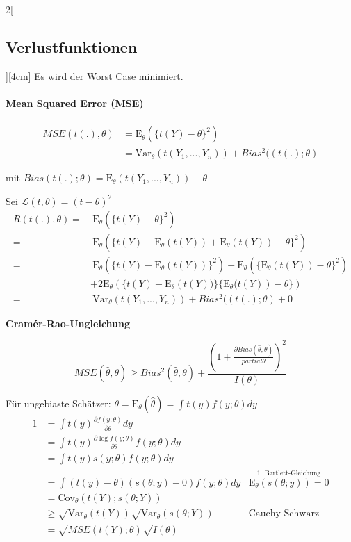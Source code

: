 \documentclass[8pt]{extarticle}
\begin{document}
\begin{multicols}{2}[\subsection{Verlustfunktionen}][4cm]
\noindent Es wird der Worst Case minimiert.

\paragraph{Mean Squared Error (MSE)}
\begin{align*}
MSE(t(.), \theta) &= \mathrm{E}_\theta\left(\{t(Y)-\theta\}^2\right) \\
&=\mathrm{Var}_\theta\left(t(Y_1,...,Y_n)\right) + Bias^2((t(.); \theta)
\end{align*}

\noindent mit $Bias(t(.);\theta) = \mathrm{E}_\theta\left(t(Y_1,...,Y_n)\right)-\theta$

\begin{Beweis}
Sei $\mathcal{L}(t, \theta) = (t-\theta)^2$
\begin{align*}
R(t(.), \theta) = &\: \mathrm{E}_\theta (\{t(Y) -\theta\}^2) \\
= &\: \mathrm{E}_\theta (\{t(Y) - \mathrm{E}_\theta(t(Y)) + \mathrm{E}_\theta(t(Y))-\theta\}^2) \\
= &\: \mathrm{E}_\theta (\{t(Y) - \mathrm{E}_\theta(t(Y))\}^2) +
\mathrm{E}_\theta (\{\mathrm{E}_\theta(t(Y))-\theta\}^2) \\
& +  2\mathrm{E}_\theta (\{t(Y)-\mathrm{E}_\theta \left(t(Y))\}\{\mathrm{E}_\theta (t(Y)\right)-\theta\}) \\
= &\: \mathrm{Var}_\theta(t(Y_1,...,Y_n)) + Bias^2((t(.); \theta) + 0
\end{align*}
\end{Beweis}

\textbf{Cramér-Rao-Ungleichung}

$$MSE(\hat{\theta}, \theta) \geq Bias^2(\hat{\theta},\theta) + 
\frac{\left(1+
\frac{\partial Bias(\hat{\theta}, \theta)}{partial \theta}
\right)^2}{I(\theta)}$$

\begin{Beweis}
Für ungebiaste Schätzer: $ \theta = \mathrm{E}_\theta(\hat{\theta}) = \int t(y)f(y;\theta)dy$
\begin{align*}
1 &= \int t(y) \frac{\partial f(y;\theta)}{\partial \theta} dy \\
&= \int t(y) \frac{\partial \log f(y;\theta)}{\partial \theta} f(y;\theta) dy \\
&= \int t(y) s(y;\theta) f(y;\theta) dy \\
&= \int \left( t(y)-\theta\right)\left(s(\theta;y)-0\right)f(y;\theta)dy
& \overset{\text{1. Bartlett-Gleichung}}{\mathrm{E}_\theta \left(s(\theta;y)\right) = 0}\\
&= \mathrm{Cov}_\theta\left(t(Y);s(\theta;Y)\right) \\
&\geq \sqrt{\mathrm{Var}_\theta(t(Y))} \sqrt{\mathrm{Var}_\theta(s(\theta;Y))} & \text{Cauchy-Schwarz} \\
&= \sqrt{MSE(t(Y);\theta)} \sqrt{I(\theta)}
\end{align*}
\end{Beweis}


\end{multicols}
\end{document}
